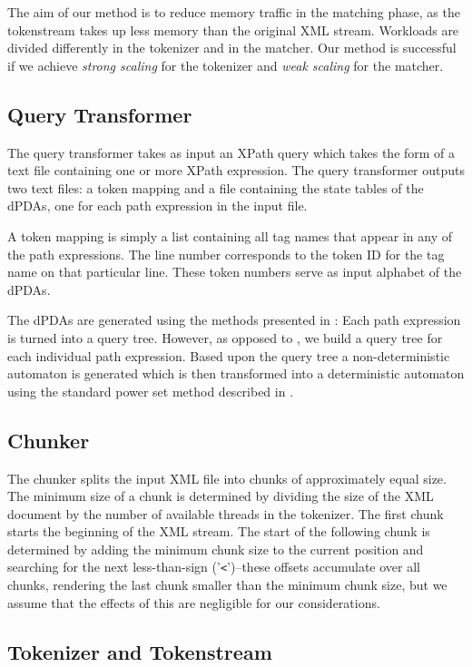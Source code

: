 The aim of our method is to reduce memory traffic in the matching phase, as the
tokenstream takes up less memory than the original XML stream. Workloads are
divided differently in the tokenizer and in the matcher. Our method is
successful if we achieve \emph{strong scaling} for the tokenizer and \emph{weak
scaling} for the matcher.

\subsection{Query Transformer}

The query transformer takes as input an XPath query which takes the form of a
text file containing one or more XPath expression. The query transformer outputs
two text files: a token mapping and a file containing the state tables of
the dPDAs, one for each path expression in the input file.

A token mapping is simply a list containing all tag names that appear in any of
the path expressions. The line number corresponds to the token ID for the tag
name on that particular line. These token numbers serve as input alphabet of
the dPDAs.

The dPDAs are generated using the methods presented in \cite{Green2004}: Each
path expression is turned into a query tree. However, as opposed to
\cite{Green2004}, we build a query tree for each individual path expression.
Based upon the query tree a non-deterministic automaton is generated which is
then transformed into a deterministic automaton using the standard power set
method described in \cite{Hopcroft2006}.

\subsection{Chunker}

The chunker splits the input XML file into chunks of approximately equal size.
The minimum size of a chunk is determined by dividing the size of the XML
document by the number of available threads in the tokenizer. The first chunk
starts the beginning of the XML stream. The start of the following chunk is
determined by adding the minimum chunk size to the current position and
searching for the next less-than-sign ('\texttt{<}')–these offsets accumulate
over all chunks, rendering the last chunk smaller than the minimum chunk size,
but we assume that the effects of this are negligible for our considerations.

\subsection{Tokenizer and Tokenstream}

